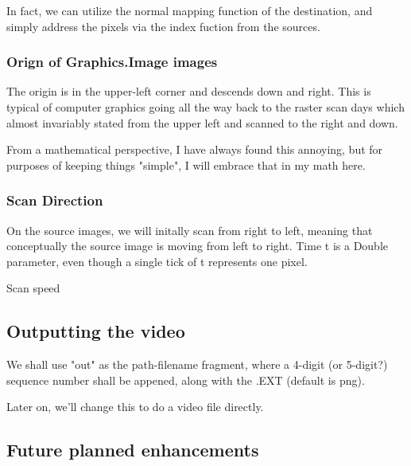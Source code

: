 \documentclass[letterpaper, 11pt]{article}
\begin{document}
In fact, we can utilize the normal mapping function of the destination, and 
simply address the pixels via the index fuction from the sources.

\subsubsection{Orign of Graphics.Image images}
\label{sec:org0410dae}
The origin is in the upper-left corner and descends down and right.
This is typical of computer graphics going all the way back to the raster scan
days which almost invariably stated from the upper left and scanned to the
right and down.

From a mathematical perspective, I have always found this annoying, but for
purposes of keeping things "simple", I will embrace that in my math here.
\subsubsection{Scan Direction}
\label{sec:org9dbb8e6}
On the source images, we will initally scan from right to left, meaning that
conceptually the source image is moving from left to right. Time t is a Double
parameter, even though a single tick of t represents one pixel.

Scan speed 
\subsection{Outputting the video}
\label{sec:orgf3e8a5a}
We shall use "out" as the path-filename fragment, where
a 4-digit (or 5-digit?) sequence number shall be appened,
along with the .EXT (default is png).

Later on, we'll change this to do a video file directly. 

\subsection{Future planned enhancements}
\label{sec:org645c9a9}
\end{document}
